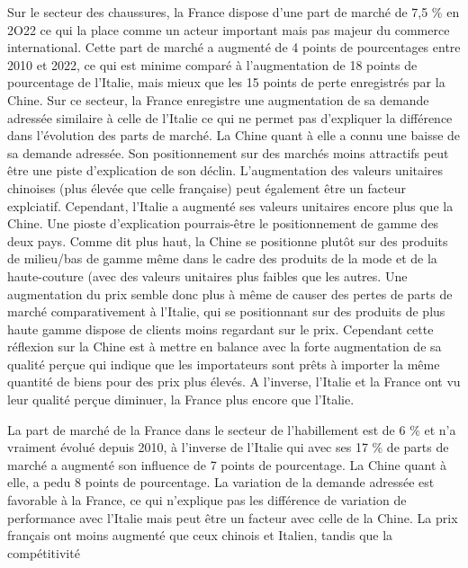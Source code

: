 \documentclass[french,10pt,a4paper]{article}
\begin{document}
Sur le secteur des chaussures, la France dispose d'une part de marché de 7,5 \% en 2O22 ce qui la place comme un acteur important mais pas majeur du commerce international. Cette part de marché a augmenté de 4 points de pourcentages entre 2010 et 2022, ce qui est minime comparé à l'augmentation de 18 points de pourcentage de l'Italie, mais mieux que les 15 points de perte enregistrés par la Chine. Sur ce secteur, la France enregistre une augmentation de sa demande adressée similaire à celle de l'Italie ce qui ne permet pas d'expliquer la différence dans l'évolution des parts de marché. La Chine quant à elle a connu une baisse de sa demande adressée. Son positionnement sur des marchés moins attractifs peut être une piste d'explication de son déclin. L'augmentation des valeurs unitaires chinoises (plus élevée que celle française) peut également être un facteur explciatif. Cependant, l'Italie a augmenté ses valeurs unitaires encore plus que la Chine. Une pioste d'explication pourrais-être le positionnement de gamme des deux pays. Comme dit plus haut, la Chine se positionne plutôt sur des produits de milieu/bas de gamme même dans le cadre des produits de la mode et de la haute-couture (avec des valeurs unitaires plus faibles que les autres. Une augmentation du prix semble donc plus à même de causer des pertes de parts de marché comparativement à l'Italie, qui se positionnant sur des produits de plus haute gamme dispose de clients moins regardant sur le prix. Cependant cette réflexion sur la Chine est à mettre en balance avec la forte augmentation de sa qualité perçue qui indique que les importateurs sont prêts à importer la même quantité de biens pour des prix plus élevés. A l'inverse, l'Italie et la France ont vu leur qualité perçue diminuer, la France plus encore que l'Italie.

La part de marché de la France dans le secteur de l'habillement est de 6 \% et n'a vraiment évolué depuis 2010, à l'inverse de l'Italie qui avec ses 17 \% de parts de marché a augmenté son influence de 7 points de pourcentage. La Chine quant à elle, a pedu 8 points de pourcentage. La variation de la demande adressée est favorable à la France, ce qui n'explique pas les différence de variation de performance avec l'Italie mais peut être un facteur avec celle de la Chine. La prix français ont moins augmenté que ceux chinois et Italien, tandis que la compétitivité 
\end{document}
